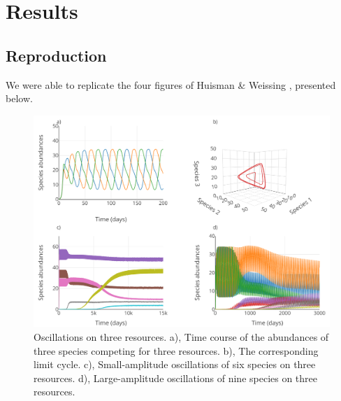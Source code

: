 \section{Results}
\subsection{Reproduction}

We were able to replicate the four figures of Huisman \& Weissing \cite{1999:Huisman}, presented below. 

\begin{figure}[H]
\begin{center} 
 \includegraphics[width=1\textwidth]{../Code/Figures/Figure_1.pdf}
  \caption{Oscillations on three resources. a), Time course of the abundances of three species competing for three resources. b), The corresponding limit cycle. c), Small-amplitude oscillations of six species on three resources. d), Large-amplitude oscillations of nine species on three resources.}
  \label{figures:Fig1}
\end{center}
\end{figure}

